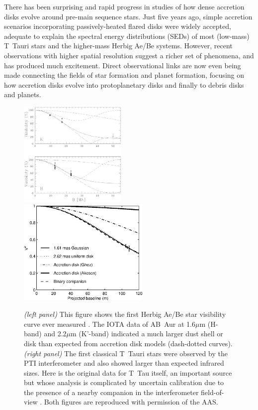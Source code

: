 \documentclass[12pt]{article}
\begin{document}
There has been surprising and rapid progress in studies of how dense
accretion disks evolve around pre-main sequence stars.  Just five
years ago, simple accretion scenarios incorporating passively-heated
flared disks \citep[e.g.,][]{hillenbrand1992,hartmann1993,chiang1997}
were widely accepted, 
adequate to explain the spectral energy distributions (SEDs) of
most (low-mass) T~Tauri stars and the higher-mass Herbig Ae/Be
systems.  However, recent observations with higher spatial resolution
suggest a richer set of phenomena, and has produced much excitement.
Direct observational links are now even being made connecting the
fields of star formation and planet formation, focusing on how
accretion disks evolve into protoplanetary disks and finally to debris
disks and planets.

\begin{figure}[tbhp]
\begin{center}
\includegraphics[clip,angle=0,height=2.0in]{Figures/JDM_millan_fig1.eps}
\includegraphics[clip,angle=0,height=2.0in]{Figures/JDM_akeson2000.eps}
\caption{\footnotesize {\em (left panel)} This figure shows the
  first Herbig Ae/Be star visibility curve ever measured \citep[see
  Figure~1 by][]{rmg1999a}. The IOTA data of AB~Aur at 1.6$\mu$m (H-band) and
  2.2$\mu$m (K'-band) indicated a much larger dust shell or disk than
  expected from accretion disk models (dash-dotted curves).  {\em
    (right panel)} The first classical T~Tauri stars were observed by
  the PTI interferometer and also showed larger than expected infrared
  sizes.  Here is the original data for T~Tau itself, an important
  source but whose analysis is complicated by uncertain calibration
  due to the presence of a nearby companion in the interferometer
  field-of-view \citep[see Figure~1a by][]{akeson2000}.  Both figures are
  reproduced with permission of the AAS.
\label{ysos}}
\end{center}
\end{figure}
\end{document}
